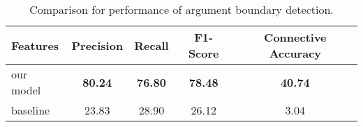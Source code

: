 \begin{table}[ht]
\centering
\begin{tabular}{|l|c|c|c|c|}
\hline

\bf Features        & \bf Precision & \bf Recall & \bf F1-Score & \bf Connective Accuracy \\ \hline
    our model       & \bf 80.24     & \bf 76.80  & \bf 78.48    & \bf 40.74               \\ \hline
    baseline        &     23.83     &     28.90  &     26.12    &      3.04               \\ \hline

\end{tabular}
\caption{\label{t:argument-baseline} Comparison for performance of argument boundary detection. }
\end{table}
